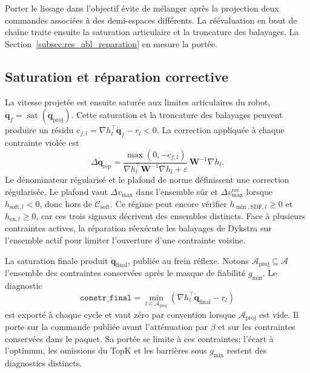 Porter le lissage dans l'objectif évite de mélanger après la projection deux commandes associées à des demi-espaces différents. La réévaluation en bout de chaîne traite ensuite la saturation articulaire et la troncature des balayages. La Section~\ref{subsec:res_abl_reparation} en mesure la portée.

\subsection*{Saturation et réparation corrective}

La vitesse projetée est ensuite saturée aux limites articulaires du robot, $\dot{\mathbf{q}}_{f} = \operatorname{sat}(\dot{\mathbf{q}}_{\mathrm{proj}})$. Cette saturation et la troncature des balayages peuvent produire un résidu $c_{f,l}=\nabla h_l^\top\dot{\mathbf{q}}_f-r_l<0$. La correction appliquée à chaque contrainte violée est
\begin{equation}
\Delta\dot{\mathbf{q}}_{\mathrm{rep}}
=
\frac{
\max(0,-c_{f,l})
}{
\nabla h_l^\top\mathbf{W}^{-1}\nabla h_l+\varepsilon
}
\,\mathbf{W}^{-1}\nabla h_l.
\end{equation}
Le dénominateur régularisé et le plafond de norme définissent une correction régularisée. Le plafond vaut $\Delta v_{\max}$ dans l'ensemble sûr et $\Delta v_{\max}^{\mathrm{rec}}$ lorsque $h_{\mathrm{soft},l}<0$, donc hors de $\mathcal{C}_{\mathrm{soft}}$. Ce régime peut encore vérifier $h_{\min,\mathrm{SDF},l}\geq0$ et $h_{\mathrm{ex},l}\geq0$, car ces trois signaux décrivent des ensembles distincts. Face à plusieurs contraintes actives, la réparation réexécute les balayages de Dykstra sur l'ensemble actif pour limiter l'ouverture d'une contrainte voisine.

La saturation finale produit $\dot{\mathbf{q}}_{\mathrm{final}}$, publiée au frein réflexe. Notons $\mathcal A_{\mathrm{proj}}\subseteq\mathcal A$ l'ensemble des contraintes conservées après le masque de fiabilité $g_{\min}$. Le diagnostic
\begin{equation}
\texttt{constr\_final}
=\min_{l\in\mathcal A_{\mathrm{proj}}}
\left(\nabla h_l^\top\dot{\mathbf{q}}_{\mathrm{final}}-r_l\right)
\end{equation}
est exporté à chaque cycle et vaut zéro par convention lorsque $\mathcal A_{\mathrm{proj}}$ est vide. Il porte sur la commande publiée avant l'atténuation par $\beta$ et sur les contraintes conservées dans le paquet. Sa portée se limite à ces contraintes; l'écart à l'optimum, les omissions du TopK et les barrières sous $g_{\min}$ restent des diagnostics distincts.

